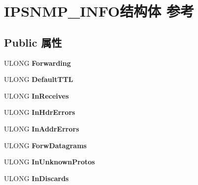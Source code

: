 \hypertarget{struct_i_p_s_n_m_p___i_n_f_o}{}\section{I\+P\+S\+N\+M\+P\+\_\+\+I\+N\+F\+O结构体 参考}
\label{struct_i_p_s_n_m_p___i_n_f_o}
\subsection*{Public 属性}
\begin{DoxyCompactItemize}
\item 
\mbox{\label{struct_i_p_s_n_m_p___i_n_f_o_a129211842c9129bb26a9da30e88275b4}} 
U\+L\+O\+NG {\bfseries Forwarding}
\item 
\mbox{\label{struct_i_p_s_n_m_p___i_n_f_o_a08e701b8160eb48ee34e658824f10171}} 
U\+L\+O\+NG {\bfseries Default\+T\+TL}
\item 
\mbox{\label{struct_i_p_s_n_m_p___i_n_f_o_afae863d1380165c6b671949c26b74940}} 
U\+L\+O\+NG {\bfseries In\+Receives}
\item 
\mbox{\label{struct_i_p_s_n_m_p___i_n_f_o_a00a44e75bd017b10ed8ebee2ef0da02b}} 
U\+L\+O\+NG {\bfseries In\+Hdr\+Errors}
\item 
\mbox{\label{struct_i_p_s_n_m_p___i_n_f_o_af2eafa4a85dedd51c6e432578664798b}} 
U\+L\+O\+NG {\bfseries In\+Addr\+Errors}
\item 
\mbox{\label{struct_i_p_s_n_m_p___i_n_f_o_a36f2bdce3482354724bbe1f6b21e4795}} 
U\+L\+O\+NG {\bfseries Forw\+Datagrams}
\item 
\mbox{\label{struct_i_p_s_n_m_p___i_n_f_o_a9bf127f9caa64d28db8201a72e00f90a}} 
U\+L\+O\+NG {\bfseries In\+Unknown\+Protos}
\item 
\mbox{\label{struct_i_p_s_n_m_p___i_n_f_o_a7c135c6aa0334d1dfcef82385b202af8}} 
U\+L\+O\+NG {\bfseries In\+Discards}
\item 

\end{DoxyCompactItemize}
